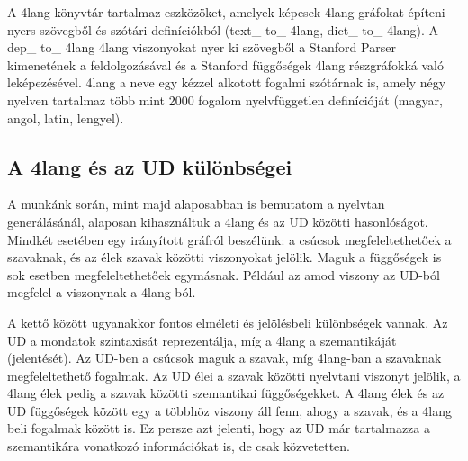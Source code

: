 A 4lang könyvtár tartalmaz eszközöket, amelyek képesek 4lang gráfokat építeni nyers szövegből és szótári definíciókból (text\_ to\_ 4lang, dict\_ to\_ 4lang). A dep\_ to\_ 4lang 4lang viszonyokat nyer ki szövegből a Stanford Parser \cite{deMarneffe:2008} kimenetének a feldolgozásával és a Stanford függőségek 4lang részgráfokká való leképezésével.
4lang a neve egy kézzel alkotott  fogalmi szótárnak is, amely négy nyelven tartalmaz több mint 2000 fogalom nyelvfüggetlen definícióját (magyar, angol, latin, lengyel). \cite{Kornai:2013}


\subsection{A 4lang és az UD különbségei}
\label{sec:4LvsUD}
A munkánk során, mint majd alaposabban is bemutatom a nyelvtan generálásánál, alaposan kihasználtuk a 4lang és az UD közötti hasonlóságot. Mindkét esetében egy irányított gráfról beszélünk: a csúcsok megfeleltethetőek a szavaknak, és az élek szavak közötti viszonyokat jelölik. Maguk a függőségek is sok esetben megfeleltethetőek egymásnak. Például az amod viszony az UD-ból megfelel a   viszonynak a 4lang-ból.

A kettő között ugyanakkor fontos elméleti és jelölésbeli különbségek vannak. Az UD a mondatok szintaxisát reprezentálja, míg a 4lang a szemantikáját (jelentését). Az UD-ben a csúcsok maguk a szavak, míg 4lang-ban a szavaknak megfeleltethető fogalmak. Az UD élei a szavak közötti nyelvtani viszonyt jelölik, a 4lang élek pedig a szavak közötti szemantikai függőségekket. A 4lang élek és az UD függőségek között egy a többhöz viszony áll fenn, ahogy a szavak, és a 4lang beli fogalmak között is. Ez persze azt jelenti, hogy az UD már tartalmazza a szemantikára vonatkozó információkat is, de csak közvetetten.

